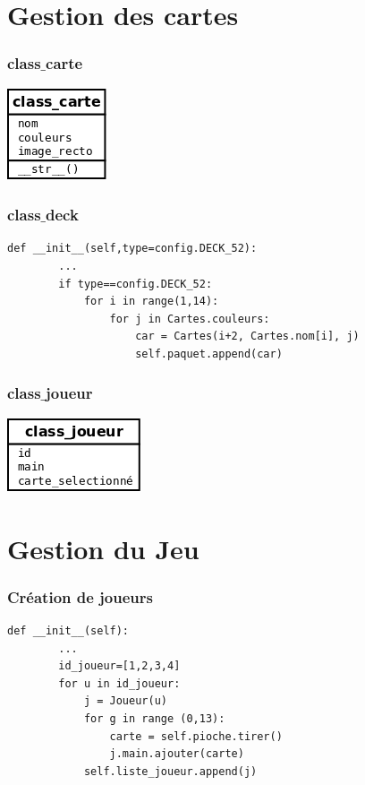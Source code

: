 \documentclass{beamer}
\begin{document}
\section{Gestion des cartes}

\begin{frame}
\frametitle{class$\_$carte}

\begin{center}
  \includegraphics[scale=0.8]{./img/class_carte.png}
\end{center}
\end{frame}

\begin{frame}[containsverbatim]
\frametitle{class$\_$deck}

\begin{lstlisting}[tabsize=4,gobble=4]
	def __init__(self,type=config.DECK_52):
		...
		if type==config.DECK_52: 
            for i in range(1,14):
                for j in Cartes.couleurs:
                    car = Cartes(i+2, Cartes.nom[i], j)
                    self.paquet.append(car)
\end{lstlisting}
\end{frame}

\begin{frame}
\frametitle{class$\_$joueur}

\begin{center}
  \includegraphics[scale=0.8]{./img/class_joueur.png}
\end{center}
\end{frame}

\section{Gestion du Jeu}
\begin{frame}[containsverbatim]
\frametitle{Création de joueurs}

\begin{lstlisting}[tabsize=4,gobble=4]
	def __init__(self):
		...
		id_joueur=[1,2,3,4]
        for u in id_joueur:
            j = Joueur(u)
            for g in range (0,13):
                carte = self.pioche.tirer()
                j.main.ajouter(carte)
            self.liste_joueur.append(j)
\end{lstlisting}
\end{frame}
\end{document}
